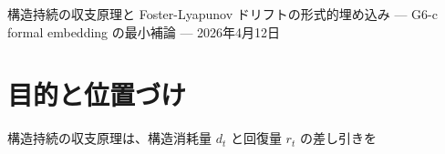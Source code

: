 \documentclass[12pt,a4paper]{article}
\begin{document}
\PaperTitleBlock
  {構造持続の収支原理と Foster-Lyapunov ドリフトの形式的埋め込み}
  {— G6-c formal embedding の最小補論 —}
  {2026年4月12日}

\begin{abstract}
本補論は、構造持続の収支原理が既存理論と単に「似ている」のではなく、少なくとも一つの古典的 drift calculus を構造持続の収支原理の変数へ形式的に埋め込めることを示す。

対象にするのは、離散時間過程に対する Foster-Lyapunov drift 条件である。確率過程 \(X_{t}\) と非負関数 \(W\) に対して、負荷

\[
Z_{t} := W(X_{t})
\]

を置き、一段の差分を

\[
b_{t} := Z_{t+1}-Z_{t}
\]

と定義すると、累積純消耗量は

\[
B_{n} = \sum_{t=0}^{n-1} b_{t} = Z_{n}-Z_0
\]

となる。また、相対的維持量を

\[
R_{t} := e^{-Z_{t}}
\]

と置けば、

\[
R_{t+1}=R_{t} e^{-b_{t}}
\]

が成り立つ。これは、構造持続の収支原理の局所更新と同じ algebraic shape を持つ。

本補論の主張は限定的である。Foster-Lyapunov theorem の正再帰性定理や幾何的エルゴード性を再証明するものではない。Markov 性、irreducibility、小集合条件、moment 条件など、元理論の仮定はそのまま保持される。本補論が示すのは、Foster-Lyapunov drift calculus の負荷差分が、構造持続の収支原理の純消耗量 \(b_{t}\) として読める、という最小の G6-c formal embedding である。

この最小埋め込みは Lean 側でも \texttt{Survival/LyapunovBalanceEmbedding.lean} として形式化されている。Lean が証明しているのは、望遠鏡和、指数的維持量の局所恒等式、正負部分による \(b_{t}=d_{t}-r_{t}\) 分解、および \texttt{QueueStability.lean} の excess demand を純消耗量として読む wrapper である。positive recurrence や \(R_{n} \le R_0 e^{-cn}\) 型の指数減衰境界は、次の iteration の対象であり、本補論の範囲外である。
\end{abstract}

\section{目的と位置づけ}\label{ux76eeux7684ux3068ux4f4dux7f6eux3065ux3051}

構造持続の収支原理は、構造消耗量 \(d_{t}\) と回復量 \(r_{t}\) の差し引きを
\end{document}
